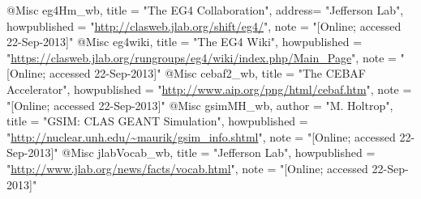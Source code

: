 @Misc{ eg4Hm_wb,
  title = "The EG4 Collaboration",
  address= "Jefferson Lab",
  howpublished = "\url{http://clasweb.jlab.org/shift/eg4/}", 
  note = "[Online; accessed 22-Sep-2013]"
}
@Misc{ eg4wiki,
  title = "The EG4 Wiki",
  howpublished = "\url{https://clasweb.jlab.org/rungroups/eg4/wiki/index.php/Main\_Page}", 
  note = "[Online; accessed 22-Sep-2013]"
}
@Misc{ cebaf2_wb,
  title = "The {CEBAF} Accelerator",
  howpublished = "\url{http://www.aip.org/png/html/cebaf.htm}", 
  note = "[Online; accessed 22-Sep-2013]"
}
@Misc{ gsimMH_wb,
  author = "M. Holtrop",
  title = "{GSIM: CLAS GEANT Simulation}",
  howpublished = "\url{http://nuclear.unh.edu/\~maurik/gsim\_info.shtml}", 
  note = "[Online; accessed 22-Sep-2013]"
}
@Misc{ jlabVocab_wb,
  title = "Jefferson Lab",
  howpublished = "\url{http://www.jlab.org/news/facts/vocab.html}", 
  note = "[Online; accessed 22-Sep-2013]"
}
